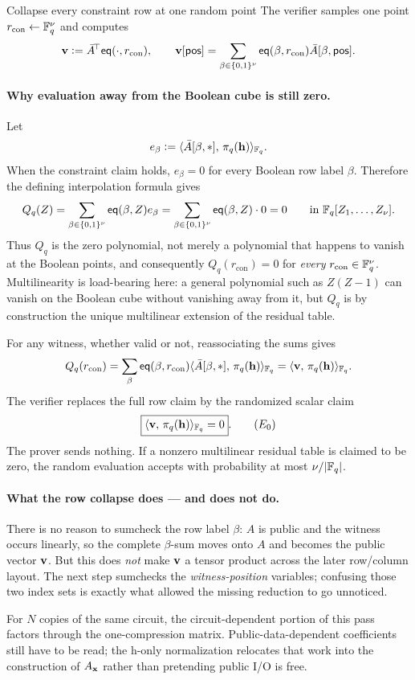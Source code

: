 \begin{step}{Collapse every constraint row at one random point}{%
}\label{step:collapse}
The verifier samples one point
$r_{\mathrm{con}}\leftarrow\mathbb{F}_q^{\nu}$ and computes
\[
  \mathbf{v}
  \vcentcolon=
  \bar A^{\!\top}\mathsf{eq}(\cdot,r_{\mathrm{con}}),
  \qquad
  \mathbf{v}[\mathsf{pos}]
  =\sum_{\beta\in\{0,1\}^{\nu}}
      \mathsf{eq}(\beta,r_{\mathrm{con}})\bar A[\beta,\mathsf{pos}].
\]

\paragraph{Why evaluation away from the Boolean cube is still zero.}
Let
\[
  e_{\beta}
  \vcentcolon=
  \langle \bar A[\beta,*],\, \pi_q(\mathbf{h})\rangle_{\mathbb{F}_q}.
\]
When the constraint claim holds, $e_{\beta}=0$ for every Boolean row label
$\beta$.  Therefore the defining interpolation formula gives
\[
  Q_q(Z)
  =\sum_{\beta\in\{0,1\}^{\nu}}\mathsf{eq}(\beta,Z)e_{\beta}
  =\sum_{\beta\in\{0,1\}^{\nu}}\mathsf{eq}(\beta,Z)\cdot 0
  =0
  \qquad\text{in }\mathbb{F}_q[Z_1,\ldots,Z_{\nu}].
\]
Thus $Q_q$ is the zero polynomial, not merely a polynomial that happens to
vanish at the Boolean points, and consequently
$Q_q(r_{\mathrm{con}})=0$ for \emph{every}
$r_{\mathrm{con}}\in\mathbb{F}_q^{\nu}$.  Multilinearity is load-bearing here: a general
polynomial such as $Z(Z-1)$ can vanish on the Boolean cube without vanishing
away from it, but $Q_q$ is by construction the unique multilinear extension of
the residual table.

For any witness, whether valid or not, reassociating the sums gives
\[
  Q_q(r_{\mathrm{con}})
  =\sum_{\beta}\mathsf{eq}(\beta,r_{\mathrm{con}})
       \langle \bar A[\beta,*],\, \pi_q(\mathbf{h})\rangle_{\mathbb{F}_q}
  =\langle \mathbf{v},\, \pi_q(\mathbf{h})\rangle_{\mathbb{F}_q}.
\]
The verifier replaces the full row claim by the randomized scalar claim
\[
  \boxed{\langle \mathbf{v},\, \pi_q(\mathbf{h})\rangle_{\mathbb{F}_q}=0}.             \tag{$E_0$}
\]
The prover sends nothing.  If a nonzero multilinear residual table is claimed
to be zero, the random evaluation accepts with probability at most
$\nu/|\mathbb{F}_q|$.

\paragraph{What the row collapse does --- and does not do.}
There is no reason to sumcheck the row label $\beta$: $A$ is public and the
witness occurs linearly, so the complete $\beta$-sum moves onto $A$ and becomes
the public vector $\mathbf{v}$.  But this does \emph{not} make $\mathbf{v}$ a tensor product
across the later row/column layout.  The next step sumchecks the
\emph{witness-position} variables; confusing those two index sets is exactly
what allowed the missing reduction to go unnoticed.

For $N$ copies of the same circuit, the circuit-dependent portion of this pass
factors through the one-compression matrix.  Public-data-dependent coefficients
still have to be read; the h-only normalization relocates that work into the
construction of $A_{\mathbf{x}}$ rather than pretending public I/O is free.

\end{step}

